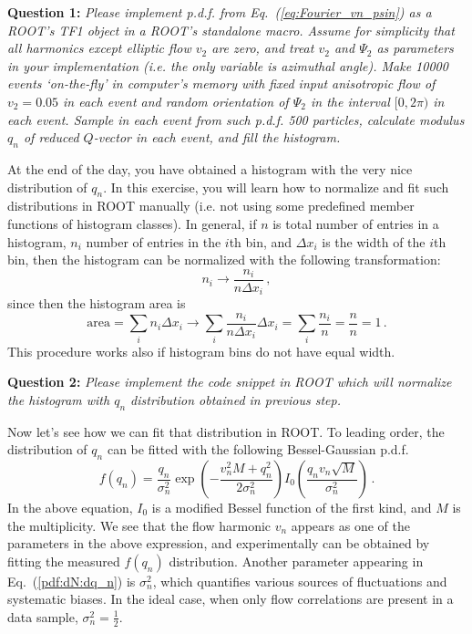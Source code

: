 \documentclass[11pt]{article}
\begin{document}
\bigskip\bigskip\bigskip
	
\noindent\textbf{Question 1:} {\it Please implement p.d.f. from Eq.~(\ref{eq:Fourier_vn_psin}) as a ROOT's TF1 object in a ROOT's standalone macro. Assume for simplicity that all harmonics except elliptic flow $v_2$ are zero, and treat $v_2$ and $\Psi_2$ as parameters in your implementation (i.e. the only variable is azimuthal angle). Make 10000 events `on-the-fly' in computer's memory with fixed input anisotropic flow of $v_2 = 0.05$ in each event and random orientation of $\Psi_2$ in the interval $[0,2\pi)$ in each event. Sample in each event from such p.d.f. 500 particles, calculate modulus $q_n$ of reduced $Q$-vector in each event, and fill the histogram.}
	
\bigskip
	
\noindent At the end of the day, you have obtained a histogram with the very nice distribution of $q_n$. In this exercise, you will learn how to normalize and fit such distributions in ROOT manually (i.e. not using some predefined member functions of histogram classes). In general, if $n$ is total number of entries in a histogram, $n_i$ number of entries in the $i$th bin, and $\Delta x_i$ is the width of the $i$th bin, then the histogram can be normalized with the following transformation:
% 
\begin{equation}
n_i \rightarrow \frac{n_i}{n\Delta x_i}\,,
\label{eq:normalization1} 
\end{equation}
%
since then the histogram area is
% 
\begin{equation}
\mathrm{area} = \sum_i n_i\Delta x_i \rightarrow \sum_i \frac{n_i}{n\Delta x_i}\Delta x_i = \sum_i\frac{n_i}{n} = \frac{n}{n} = 1 \,.
\label{eq:normalization2} 
\end{equation}
%
This procedure works also if histogram bins do not have equal width.
	
\bigskip

\noindent\textbf{Question 2: }{\it Please implement the code snippet in ROOT which will normalize the histogram with $q_n$ distribution obtained in previous step.}
	
\bigskip
	
\noindent Now let's see how we can fit that distribution in ROOT. To leading order, the distribution of $q_n$ can be fitted with the following Bessel-Gaussian p.d.f.
%
\begin{equation}
f(q_n) = \frac{q_n}{\sigma_n^2}\exp\left(-\frac{v_n^2 M+q_n^2}{2\sigma_n^2}\right)I_0\left(\frac{q_n v_n \sqrt{M}}{\sigma_n^2}\right)\,.
\label{pdf:dN:dq_n}
\end{equation}
%
In the above equation, $I_0$ is a modified Bessel function of the first kind, and $M$ is the multiplicity. We see that the flow harmonic $v_n$ appears as one of the parameters in the above expression, and experimentally can be obtained by fitting the measured $f(q_n)$ distribution. Another parameter appearing in Eq.~(\ref{pdf:dN:dq_n}) is $\sigma_n^2$, which quantifies various sources of fluctuations and systematic biases. In the ideal case, when only flow correlations are present in a data sample, $\sigma_n^2 = \frac{1}{2}$. 
	
\end{document}
